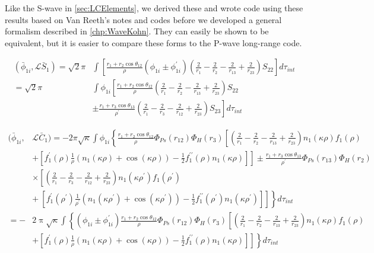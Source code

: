 \documentclass[Dissertation.tex]{subfiles}
\begin{document}
Like the S-wave in \cref{sec:LCElements}, we derived these and wrote code 
using these results based on Van Reeth's \cite{VanReethPrivate} notes and 
codes before we developed a general formalism described in \cref{chp:WaveKohn}.
They can easily be shown to be equivalent, but it is easier to compare these
forms to the P-wave long-range code.

\begin{align}
\label{eq:PWavePhi1SBar}
\nonumber \left(\bar{\phi}_{1i},\mathcal{L} \bar{S}_1\right) = \sqrt{2} \pi & \int \left[ \frac{r_1 + r_2 \cos\theta_{12}}{\rho} \left(\phi_{1i} \pm \phi_{1i}^\prime \right) \left(\frac{2}{r_1} - \frac{2}{r_2} - \frac{2}{r_{13}} + \frac{2}{r_{23}} \right) S_{22} \right] d\tau_{int} \\
\nonumber = \sqrt{2} \pi & \int \phi_{1i} \left[ \frac{r_1 + r_2 \cos\theta_{12}}{\rho} \left( \frac{2}{r_1} - \frac{2}{r_2} - \frac{2}{r_{13}} + \frac{2}{r_{23}} \right) S_{22} \right. \\
& \pm \left. \frac{r_1 + r_3 \cos\theta_{13}}{\rho^\prime} \left( \frac{2}{r_1} - \frac{2}{r_3} - \frac{2}{r_{12}} + \frac{2}{r_{23}} \right) S_{23} \right]  d\tau_{int}
\end{align}


\begin{align}
\label{eq:PWavePhi1CBar}
\nonumber (\bar{\phi}_{1i},&\mathcal{L} \bar{C}_1) = -2 \pi \sqrt{\kappa} \int \phi_{1i} \left\{ \frac{r_1 + r_2 \cos\theta_{12}}{\rho} \Phi_{Ps}(r_{12}) \Phi_H(r_3) \left[ \left( \frac{2}{r_1} - \frac{2}{r_2} - \frac{2}{r_{13}} + \frac{2}{r_{23}} \right) n_1(\kappa\rho) f_1(\rho) \right. \right. \\
\nonumber & + \left.\left. \left[f_1^\prime(\rho) \frac{1}{\rho} \left( n_1(\kappa\rho) + \cos(\kappa\rho) \right) - \frac{1}{2} f_1^{\prime\prime}(\rho) n_1(\kappa\rho) \right]\right] \pm \frac{r_1 + r_3 \cos\theta_{13}}{\rho^\prime}  \Phi_{Ps}(r_{13}) \Phi_H(r_2) \right. \\
\nonumber & \times \left[ \left( \frac{2}{r_1} - \frac{2}{r_3} - \frac{2}{r_{12}} + \frac{2}{r_{23}} \right) n_1(\kappa\rho^\prime) f_1(\rho^\prime) \right. \\ 
\nonumber & \left.\left. + \ \left[f_1^\prime(\rho^\prime) \frac{1}{\rho^\prime} \left( n_1(\kappa\rho^\prime) + \cos(\kappa\rho^\prime) \right) - \frac{1}{2} f_1^{\prime\prime}(\rho^\prime) n_1(\kappa\rho^\prime) \right]\right]\right\} d\tau_{int} \\
\nonumber = -&2 \uppi \sqrt{\kappa} \int \left\{ \left( \phi_{1i} \pm \phi_{1i}^\prime \right) \frac{r_1 + r_2 \cos\theta_{12}}{\rho} \Phi_{Ps}(r_{12}) \Phi_H(r_3) \left[ \left( \frac{2}{r_1} - \frac{2}{r_2} - \frac{2}{r_{13}} + \frac{2}{r_{23}} \right) n_1(\kappa\rho) f_1(\rho) \right.\right. \\
& + \left.\left. \left[ f_1^\prime (\rho) \frac{1}{\rho} \left( n_1(\kappa\rho) + \cos(\kappa\rho) \right) - \frac{1}{2} f_1^{\prime\prime}(\rho) n_1(\kappa\rho) \right] \right] \right\} d\tau_{int}
\end{align}
\end{document}
